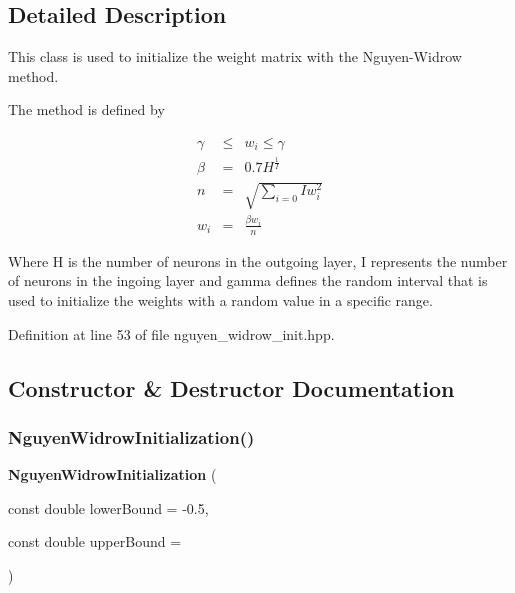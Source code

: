 \subsection{Detailed Description}
This class is used to initialize the weight matrix with the Nguyen-\/\+Widrow method. 

The method is defined by

\begin{eqnarray*} \gamma &\le& w_i \le \gamma \\ \beta &=& 0.7H^{\frac{1}{I}} \\ n &=& \sqrt{\sum_{i=0}{I}w_{i}^{2}} \\ w_i &=& \frac{\beta w_i}{n} \end{eqnarray*}

Where H is the number of neurons in the outgoing layer, I represents the number of neurons in the ingoing layer and gamma defines the random interval that is used to initialize the weights with a random value in a specific range. 

Definition at line 53 of file nguyen\+\_\+widrow\+\_\+init.\+hpp.



\subsection{Constructor \& Destructor Documentation}
\mbox{\label{classmlpack_1_1ann_1_1NguyenWidrowInitialization_aebb458897ab391c33618e53bf599a51c}} 
\subsubsection{Nguyen\+Widrow\+Initialization()}
{\footnotesize\ttfamily \textbf{ Nguyen\+Widrow\+Initialization} (\begin{DoxyParamCaption}\item[{const double}]{lower\+Bound = {\ttfamily -\/0.5},  }\item[{const double}]{upper\+Bound = {} }\end{DoxyParamCaption})\hspace{0.3cm}{\ttfamily [inline]}}



